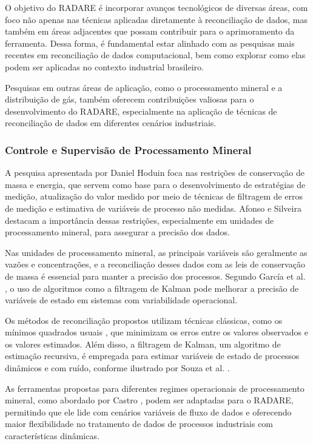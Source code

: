 O objetivo do RADARE é incorporar avanços tecnológicos de diversas áreas, com foco não apenas nas técnicas aplicadas diretamente à reconciliação de dados, mas também em áreas adjacentes que possam contribuir para o aprimoramento da ferramenta. Dessa forma, é fundamental estar alinhado com as pesquisas mais recentes em reconciliação de dados computacional, bem como explorar como elas podem ser aplicadas no contexto industrial brasileiro.

Pesquisas em outras áreas de aplicação, como o processamento mineral e a distribuição de gás, também oferecem contribuições valiosas para o desenvolvimento do RADARE, especialmente na aplicação de técnicas de reconciliação de dados em diferentes cenários industriais.

\subsubsection{Controle e Supervisão de Processamento Mineral}

A pesquisa apresentada por Daniel Hoduin \cite{danielhoduin} foca nas restrições de conservação de massa e energia, que servem como base para o desenvolvimento de estratégias de medição, atualização do valor medido por meio de técnicas de filtragem de erros de medição e estimativa de variáveis de processo não medidas. Afonso e Silveira \cite{afonsosilveira2015} destacam a importância dessas restrições, especialmente em unidades de processamento mineral, para assegurar a precisão dos dados.

Nas unidades de processamento mineral, as principais variáveis são geralmente as vazões e concentrações, e a reconciliação desses dados com as leis de conservação de massa é essencial para manter a precisão dos processos. Segundo García et al. \cite{garcia2018}, o uso de algoritmos como a filtragem de Kalman pode melhorar a precisão de variáveis de estado em sistemas com variabilidade operacional.

Os métodos de reconciliação propostos utilizam técnicas clássicas, como os mínimos quadrados usuais \cite{limapereira2019}, que minimizam os erros entre os valores observados e os valores estimados. Além disso, a filtragem de Kalman, um algoritmo de estimação recursiva, é empregada para estimar variáveis de estado de processos dinâmicos e com ruído, conforme ilustrado por Souza et al. \cite{souza2021}.

As ferramentas propostas para diferentes regimes operacionais de processamento mineral, como abordado por Castro \cite{castro2020}, podem ser adaptadas para o RADARE, permitindo que ele lide com cenários variáveis de fluxo de dados e oferecendo maior flexibilidade no tratamento de dados de processos industriais com características dinâmicas.

